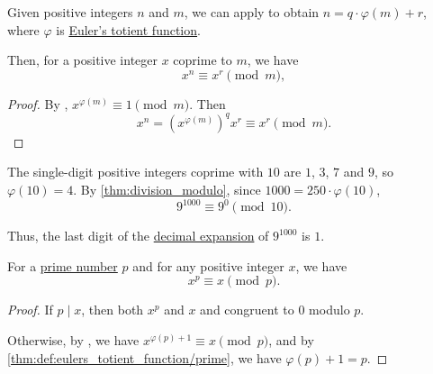 \begin{corollary}\label{thm:division_modulo}
  Given positive integers \( n \) and \( m \), we can apply  to obtain \( n = q \cdot \varphi(m) + r \), where \( \varphi \) is \hyperref[def:eulers_totient_function]{Euler's totient function}.

  Then, for a positive integer \( x \) coprime to \( m \), we have
  \begin{equation*}
    x^n \equiv x^r \pmod m,
  \end{equation*}
\end{corollary}
\begin{proof}
  By , \( x^{\varphi(m)} \equiv 1 \pmod m \). Then
  \begin{equation*}
    x^n = (x^{\varphi(m)})^q x^r \equiv x^r \pmod m.
  \end{equation*}
\end{proof}

\begin{example}\label{ex:thm:division_modulo}
  The single-digit positive integers coprime with \( 10 \) are \( 1 \), \( 3 \), \( 7 \) and \( 9 \), so \( \varphi(10) = 4 \). By \cref{thm:division_modulo}, since \( 1000 = 250 \cdot \varphi(10) \),
  \begin{equation*}
    9^{1000} \equiv 9^0 \pmod {10}.
  \end{equation*}

  Thus, the last digit of the \hyperref[def:positional_number_system/decimal]{decimal expansion} of \( 9^{1000} \) is \( 1 \).
\end{example}

\begin{theorem}\label{thm:fermats_little_theorem}
  For a \hyperref[def:prime_number]{prime number} \( p \) and for any positive integer \( x \), we have
  \begin{equation*}
    x^p \equiv x \pmod p.
  \end{equation*}
\end{theorem}
\begin{proof}
  If \( p \mid x \), then both \( x^p \) and \( x \) and congruent to \( 0 \) modulo \( p \).

  Otherwise, by , we have \( x^{\varphi(p) + 1} \equiv x \pmod p \), and by \cref{thm:def:eulers_totient_function/prime}, we have \( \varphi(p) + 1 = p \).
\end{proof}
